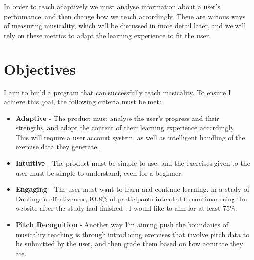 In order to teach adaptively we must analyse information about a user's performance, and then change how we teach accordingly. 
There are various ways of measuring musicality, which will be discussed in more detail later, and we will rely on these metrics to adapt the learning experience to fit the user.



\section{Objectives}

I aim to build a program that can successfully teach musicality. To ensure I achieve this goal, the following criteria must be met:
	\begin{itemize}
		\item \textbf{Adaptive} - The product must analyse the user's progress and their strengths, and adopt the content of their learning experience accordingly. This will require a user account system, as well as intelligent handling of the exercise data they generate.
		\item \textbf{Intuitive} - The product must be simple to use, and the exercises given to the user must be simple to understand, even for a beginner.
		\item \textbf{Engaging} - The user must want to learn and continue learning. In a study of Duolingo's effectiveness, 93.8\% of participants intended to continue using the website after the study had finished \cite{griffiths2012profile}. I would like to aim for at least 75\%.
		\item \textbf{Pitch Recognition} - Another way I'm aiming push the boundaries of musicality teaching is through introducing exercises that involve pitch data to be submitted by the user, and then grade them based on how accurate they are.
	\end{itemize}